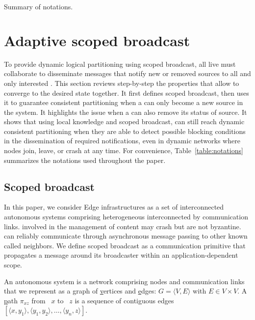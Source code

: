 
\begin{table}
  \caption{\label{table:notations}Summary of notations.}
  
\end{table}

\section{Adaptive scoped broadcast}
\label{sec:adaptive}

To provide dynamic logical partitioning using scoped broadcast, all
live \processes must collaborate to disseminate messages that notify
new or removed sources to all and only interested \processes. This
section reviews step-by-step the properties that allow \processes to
converge to the desired state together. It first defines scoped
broadcast, then uses it to guarantee consistent partitioning when a
\process can only become a new source in the system. It highlights the
issue when a \process can also remove its status of source. It shows
that using local knowledge and scoped broadcast, \processes can still
reach dynamic consistent partitioning when they are able to detect
possible blocking conditions in the dissemination of required
notifications, even in dynamic networks where nodes join, leave, or
crash at any time.
For convenience, Table~\ref{table:notations}
summarizes the notations used throughout the paper.

\subsection{Scoped broadcast}
\label{subsec:scoped}

In this paper, we consider Edge infrastructures as a set of
interconnected autonomous systems comprising heterogeneous \nodes
interconnected by communication links. \Processes involved in the
management of content may crash but are not byzantine.  \Processes can
reliably communicate through asynchronous message passing to other
known \processes called neighbors.  We define scoped broadcast as a
communication primitive that propagates a message around its
broadcaster within an application-dependent scope.

\begin{definition}
  An autonomous system is a network comprising nodes and communication
  links that we represent as a \underline{g}raph of
  \underline{v}ertices and \underline{e}dges:
  $G = \langle V, E \rangle$ with $E \in V \times V$. A
  \underline{p}ath $\pi_{xz}$ from \Process~$x$ to \Process~$z$ is a
  sequence of contiguous edges
  $[\langle x, y_1 \rangle, \langle y_1, y_2\rangle, \ldots, \langle
  y_n, z \rangle]$.
\end{definition}

